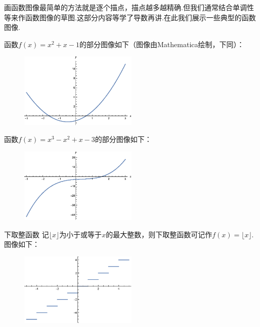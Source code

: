 \documentclass[lang=cn,math=cm,chinesefont=nofont,11pt,scheme=chinese,twocol]{elegantbook}
\begin{document}
画函数图像最简单的方法就是逐个描点，描点越多越精确.但我们通常结合单调性等来作函数图像的草图.这部分内容等学了导数再讲.在此我们展示一些典型的函数图像.

\begin{example}
  函数$f(x)=x^2+x-1$的部分图像如下（图像由Mathematica绘制，下同）：
\end{example}

\begin{figure}[h]
  \centering
  \includegraphics[width=0.5\textwidth]{image/2.1.5function1.eps}
  \label{img:2.1.5function1}
\end{figure}

\begin{example}
  函数$f(x)=x^3-x^2+x-3$的部分图像如下：
\end{example}

\begin{figure}[h]
  \centering
  \includegraphics[width=0.5\textwidth]{image/2.1.5function2.eps}
  \label{img:2.1.5function2}
\end{figure}

\begin{example}{下取整函数}
  记$\lfloor x\rfloor $为小于或等于$x$的最大整数，则下取整函数可记作$f(x)=\lfloor x\rfloor$.图像如下：
\end{example}

\begin{figure}[h]
  \centering
  \includegraphics[width=0.5\textwidth]{image/2.1.5function5.eps}
  \label{img:2.1.5function5}
\end{figure}
\end{document}
